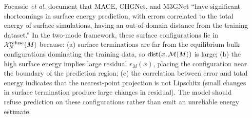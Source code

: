 \begin{example}
Focassio \emph{et al.}\cite{focassio2025surfaces} document that MACE, CHGNet, and M3GNet ``have significant shortcomings in surface energy prediction, with errors correlated to the total energy of surface simulations, having an out-of-domain distance from the training dataset.'' In the two-mode framework, these surface configurations lie in $\mathcal{X}_N^{\text{refuse}}(M)$ because: (a) surface terminations are far from the equilibrium bulk configurations dominating the training data, so $\mathrm{dist}(x, \mathcal{M}(M))$ is large; (b) the high surface energy implies large residual $r_M(x)$, placing the configuration near the boundary of the prediction region; (c) the correlation between error and total energy indicates that the nearest-point projection is not Lipschitz (small changes in surface termination produce large changes in residual). The model should refuse prediction on these configurations rather than emit an unreliable energy estimate.
\end{example}
